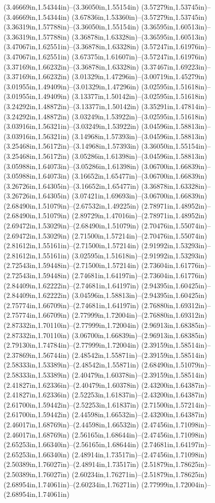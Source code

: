 (3.46669in,1.54344in)--(3.36050in,1.55154in) (3.57279in,1.53745in)--(3.46669in,1.54344in) (3.67836in,1.53360in)--(3.57279in,1.53745in) (3.36319in,1.57788in)--(3.36050in,1.55154in) (3.36595in,1.60513in)--(3.36319in,1.57788in) (3.36878in,1.63328in)--(3.36595in,1.60513in) (3.47067in,1.62551in)--(3.36878in,1.63328in) (3.57247in,1.61976in)--(3.47067in,1.62551in) (3.67375in,1.61607in)--(3.57247in,1.61976in) (3.37169in,1.66232in)--(3.36878in,1.63328in) (3.37467in,1.69223in)--(3.37169in,1.66232in) (3.01329in,1.47296in)--(3.00719in,1.45279in) (3.01955in,1.49409in)--(3.01329in,1.47296in) (3.02595in,1.51618in)--(3.01955in,1.49409in) (3.13377in,1.50142in)--(3.02595in,1.51618in) (3.24292in,1.48872in)--(3.13377in,1.50142in) (3.35291in,1.47814in)--(3.24292in,1.48872in) (3.03249in,1.53922in)--(3.02595in,1.51618in) (3.03916in,1.56321in)--(3.03249in,1.53922in) (3.04596in,1.58813in)--(3.03916in,1.56321in) (3.14968in,1.57393in)--(3.04596in,1.58813in) (3.25468in,1.56172in)--(3.14968in,1.57393in) (3.36050in,1.55154in)--(3.25468in,1.56172in) (3.05286in,1.61398in)--(3.04596in,1.58813in) (3.05988in,1.64073in)--(3.05286in,1.61398in) (3.06700in,1.66839in)--(3.05988in,1.64073in) (3.16652in,1.65477in)--(3.06700in,1.66839in) (3.26726in,1.64305in)--(3.16652in,1.65477in) (3.36878in,1.63328in)--(3.26726in,1.64305in) (3.07421in,1.69693in)--(3.06700in,1.66839in) (2.68490in,1.51079in)--(2.67532in,1.49225in) (2.78971in,1.48952in)--(2.68490in,1.51079in) (2.89729in,1.47016in)--(2.78971in,1.48952in) (2.69472in,1.53029in)--(2.68490in,1.51079in) (2.70476in,1.55074in)--(2.69472in,1.53029in) (2.71500in,1.57214in)--(2.70476in,1.55074in) (2.81612in,1.55161in)--(2.71500in,1.57214in) (2.91992in,1.53293in)--(2.81612in,1.55161in) (3.02595in,1.51618in)--(2.91992in,1.53293in) (2.72543in,1.59448in)--(2.71500in,1.57214in) (2.73604in,1.61776in)--(2.72543in,1.59448in) (2.74681in,1.64197in)--(2.73604in,1.61776in) (2.84409in,1.62222in)--(2.74681in,1.64197in) (2.94395in,1.60425in)--(2.84409in,1.62222in) (3.04596in,1.58813in)--(2.94395in,1.60425in) (2.75774in,1.66709in)--(2.74681in,1.64197in) (2.76880in,1.69312in)--(2.75774in,1.66709in) (2.77999in,1.72004in)--(2.76880in,1.69312in) (2.87332in,1.70110in)--(2.77999in,1.72004in) (2.96913in,1.68385in)--(2.87332in,1.70110in) (3.06700in,1.66839in)--(2.96913in,1.68385in) (2.79130in,1.74784in)--(2.77999in,1.72004in) (2.39159in,1.58514in)--(2.37869in,1.56744in) (2.48542in,1.55871in)--(2.39159in,1.58514in) (2.58333in,1.53389in)--(2.48542in,1.55871in) (2.68490in,1.51079in)--(2.58333in,1.53389in) (2.40479in,1.60378in)--(2.39159in,1.58514in) (2.41827in,1.62336in)--(2.40479in,1.60378in) (2.43200in,1.64387in)--(2.41827in,1.62336in) (2.52253in,1.61837in)--(2.43200in,1.64387in) (2.61700in,1.59442in)--(2.52253in,1.61837in) (2.71500in,1.57214in)--(2.61700in,1.59442in) (2.44598in,1.66532in)--(2.43200in,1.64387in) (2.46017in,1.68769in)--(2.44598in,1.66532in) (2.47456in,1.71098in)--(2.46017in,1.68769in) (2.56165in,1.68644in)--(2.47456in,1.71098in) (2.65253in,1.66340in)--(2.56165in,1.68644in) (2.74681in,1.64197in)--(2.65253in,1.66340in) (2.48914in,1.73517in)--(2.47456in,1.71098in) (2.50389in,1.76027in)--(2.48914in,1.73517in) (2.51879in,1.78625in)--(2.50389in,1.76027in) (2.60234in,1.76271in)--(2.51879in,1.78625in) (2.68954in,1.74061in)--(2.60234in,1.76271in) (2.77999in,1.72004in)--(2.68954in,1.74061in) 